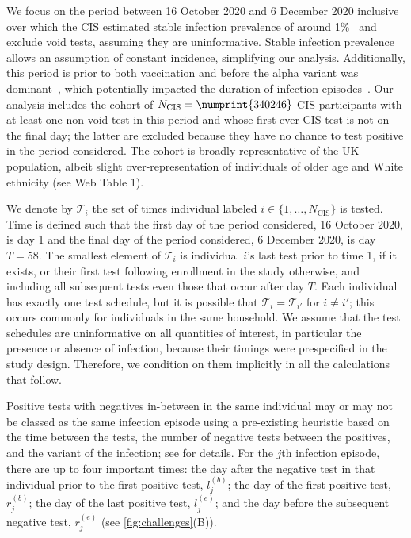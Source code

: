 \documentclass[referee,useAMS,usenatbib]{biom}
\newcommand{\Ncis}{N_\text{CIS}}
\newcommand{\sched}{\mathcal{T}}
\begin{document}
We focus on the period between 16 October 2020 and 6 December 2020 inclusive over which the CIS estimated stable infection prevalence of around 1\%~\citep{onsCISdec2020} and exclude void tests, assuming they are uninformative.
Stable infection prevalence allows an assumption of constant incidence, simplifying our analysis.
Additionally, this period is prior to both vaccination and before the alpha variant was dominant~\citep{lythgoeLineage}, which potentially impacted the duration of infection episodes~\citep{hakkiOnset,russellWithinhost}.
Our analysis includes the cohort of $\Ncis = \numprint{340246}$ CIS participants with at least one non-void test in this period and whose first ever CIS test is not on the final day; the latter are excluded because they have no chance to test positive in the period considered.
The cohort is broadly representative of the UK population, albeit slight over-representation of individuals of older age and White ethnicity (see Web Table 1).

We denote by $\sched_i$ the set of times individual labeled $i \in \{ 1, \dots, \Ncis \}$ is tested.
Time is defined such that the first day of the period considered, 16 October 2020, is day 1 and the final day of the period considered, 6 December 2020, is day $T = 58$.
The smallest element of $\sched_i$ is individual $i$'s last test prior to time 1, if it exists, or their first test following enrollment in the study otherwise, and including all subsequent tests even those that occur after day $T$.
Each individual has exactly one test schedule, but it is possible that $\sched_i = \sched_{i'}$ for $i \neq i'$; this occurs commonly for individuals in the same household.
We assume that the test schedules are uninformative on all quantities of interest, in particular the presence or absence of infection, because their timings were prespecified in the study design.
Therefore, we condition on them implicitly in all the calculations that follow.


Positive tests with negatives in-between in the same individual may or may not be classed as the same infection episode using a pre-existing heuristic based on the time between the tests, the number of negative tests between the positives, and the variant of the infection; see \citet{weiRisk} for details.
For the $j$th infection episode, there are up to four important times: the day after the negative test in that individual prior to the first positive test, $l_j^{(b)}$; the day of the first positive test, $r_j^{(b)}$; the day of the last positive test, $l_j^{(e)}$; and the day before the subsequent negative test, $r_j^{(e)}$ (see \cref{fig:challenges}(B)).
\end{document}
